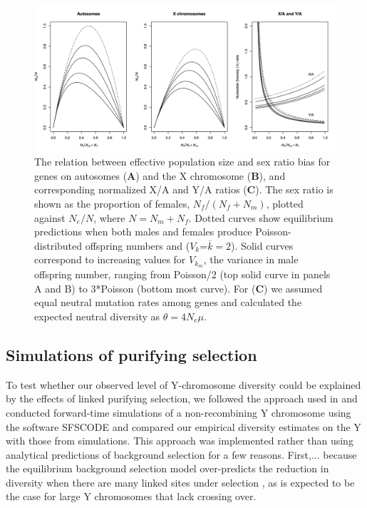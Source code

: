 \documentclass[9pt,twocolumn,twoside]{gsajnl}
\begin{document}
\begin{figure}[htbp]
\centering
\noindent
\includegraphics[width=\linewidth]{figure1.jpg}
\caption{The relation between effective population size and sex ratio bias for genes on autosomes (\textbf{A}) and the X chromosome (\textbf{B}), and corresponding normalized X/A and Y/A ratios (\textbf{C}). The sex ratio is shown as the proportion of females, $N_{f}/(N_{f}+N_{m})$, plotted against $N_{e}/N$, where $N=N_{m}+N_{f}$. Dotted curves show equilibrium predictions when both males and females produce Poisson-distributed offspring numbers and ($V_{k}$=$\overline{k}=2$). Solid curves correspond to increasing values for $V_{k_{m}}$, the variance in male offspring number, ranging from Poisson/2 (top solid curve in panels A and B) to 3*Poisson (bottom most curve). For (\textbf{C}) we assumed equal neutral mutation rates among genes and calculated the expected neutral diversity as $\theta=4N_{e}\mu$.
}
\label{fig:spectrum}
\end{figure}

\subsection*{Simulations of purifying selection}
To test whether our observed level of Y-chromosome diversity could be explained by the effects of linked purifying selection, we followed the approach used in \citep{Wilsonsayres2014} and conducted forward-time simulations of a non-recombining Y chromosome using the software SFSCODE \citep{hernandez2008flexible} and compared our empirical diversity estimates on the Y with those from simulations. This approach was implemented rather than using analytical predictions of background selection for a few reasons. First,... because the equilibrium background selection model over-predicts the reduction in diversity when there are many linked sites under selection \citep{KaiserCharlesworth}, as is expected to be the case for large Y chromosomes that lack crossing over.
\end{document}
